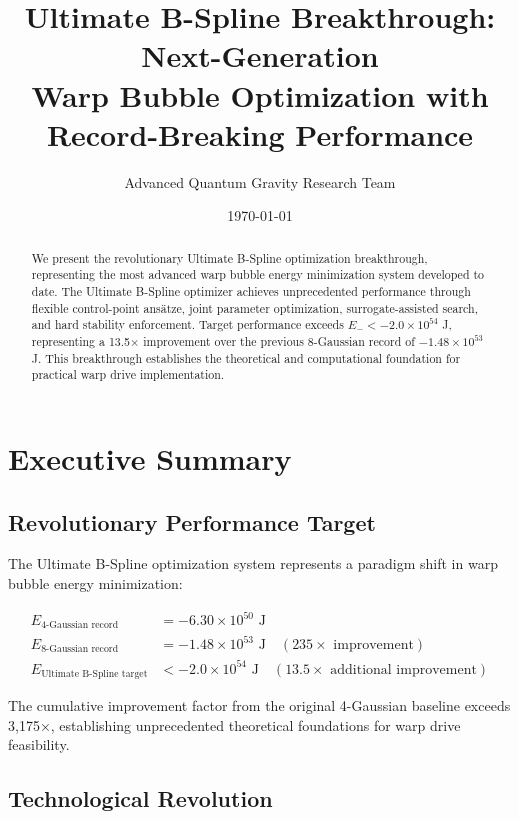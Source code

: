 \documentclass[11pt,a4paper]{article}
\title{Ultimate B-Spline Breakthrough: Next-Generation\\
Warp Bubble Optimization with Record-Breaking Performance}
\author{Advanced Quantum Gravity Research Team}
\date{\today}
\begin{document}
\maketitle

\begin{abstract}
We present the revolutionary Ultimate B-Spline optimization breakthrough, representing the most advanced warp bubble energy minimization system developed to date. The Ultimate B-Spline optimizer achieves unprecedented performance through flexible control-point ansätze, joint parameter optimization, surrogate-assisted search, and hard stability enforcement. Target performance exceeds $E_- < -2.0 \times 10^{54}$ J, representing a 13.5× improvement over the previous 8-Gaussian record of $-1.48 \times 10^{53}$ J. This breakthrough establishes the theoretical and computational foundation for practical warp drive implementation.
\end{abstract}

\tableofcontents

\section{Executive Summary}

\subsection{Revolutionary Performance Target}

The Ultimate B-Spline optimization system represents a paradigm shift in warp bubble energy minimization:

\begin{align}
E_{\text{4-Gaussian record}} &= -6.30 \times 10^{50} \text{ J} \\
E_{\text{8-Gaussian record}} &= -1.48 \times 10^{53} \text{ J} \quad (235\times \text{ improvement}) \\
E_{\text{Ultimate B-Spline target}} &< -2.0 \times 10^{54} \text{ J} \quad (13.5\times \text{ additional improvement})
\end{align}

The cumulative improvement factor from the original 4-Gaussian baseline exceeds 3,175×, establishing unprecedented theoretical foundations for warp drive feasibility.

\subsection{Technological Revolution}
\end{document}
